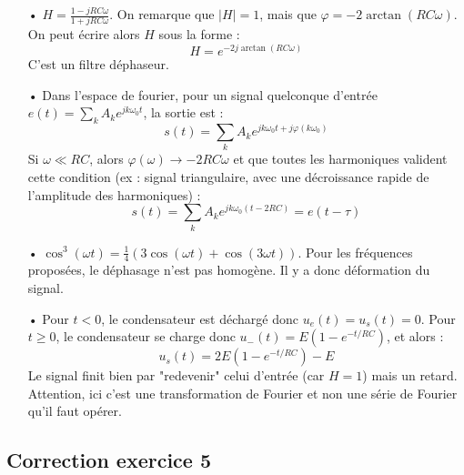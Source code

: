 \documentclass{report}
\begin{document}
\begin{itemize}
	\item[•]
	$H=\frac{1-jRC\omega}{1+jRC\omega}$. On remarque que $\mid H\mid=1$, mais que $\varphi=-2\arctan(RC\omega)$. On peut écrire alors $H$ sous la forme :
	\begin{equation}
		H=e^{-2j\arctan(RC\omega)}
	\end{equation}
C'est un filtre déphaseur.

	\item[•]
	Dans l'espace de fourier, pour un signal quelconque d'entrée $e(t)=\sum_k A_k e^{jk\omega_0 t}$, la sortie est :
	\begin{equation}
		s(t)=\sum_k A_k e^{jk\omega_0 t+j\varphi(k\omega_0)}
	\end{equation}
	Si $\omega\ll RC$, alors $\varphi(\omega)\longrightarrow-2RC\omega$ et que toutes les harmoniques valident cette condition (ex : signal triangulaire, avec une décroissance rapide de l'amplitude des harmoniques) :
	\begin{equation}
		s(t)=\sum_k A_k e^{jk\omega_0 (t-2RC)}=e(t-\tau)
	\end{equation}
	
	\item[•] $\cos^3(\omega t)=\frac{1}{4}(3\cos(\omega t) + \cos(3\omega t))$. Pour les fréquences proposées, le déphasage n'est pas homogène. Il y a donc déformation du signal. 
	
	\item[•] Pour $t<0$, le condensateur est déchargé donc $u_e(t)=u_s(t)=0$. Pour $t\geq0$, le condensateur se charge donc $u_-(t) = E(1-e^{-t/RC})$, et alors :
	\begin{equation}
		u_s(t)=2E(1-e^{-t/RC}) - E
	\end{equation}
	Le signal finit bien par "redevenir" celui d'entrée (car $H=1$) mais un retard. Attention, ici c'est une transformation de Fourier et non une série de Fourier qu'il faut opérer. 
	
\end{itemize}

\subsection*{Correction exercice 5}
\end{document}
